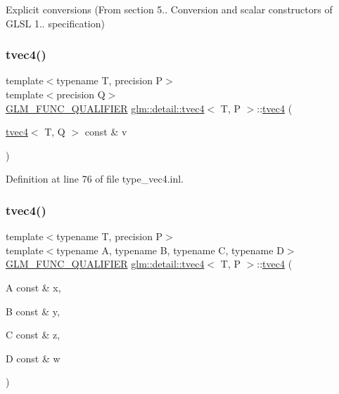 Explicit conversions (From section 5.. Conversion and scalar constructors of G\+L\+SL 1.. specification) 

\mbox{\label{structglm_1_1detail_1_1tvec4_a3030b13b21c84c52f89f14f802ae99f5}} 
\subsubsection{\texorpdfstring{tvec4()}{tvec4()}\hspace{0.1cm}{\footnotesize\ttfamily [15/23]}}
{\footnotesize\ttfamily template$<$typename T, precision P$>$ \\
template$<$precision Q$>$ \\
\hyperlink{setup_8hpp_a33fdea6f91c5f834105f7415e2a64407}{G\+L\+M\+\_\+\+F\+U\+N\+C\+\_\+\+Q\+U\+A\+L\+I\+F\+I\+ER} \hyperlink{structglm_1_1detail_1_1tvec4}{glm\+::detail\+::tvec4}$<$ T, P $>$\+::\hyperlink{structglm_1_1detail_1_1tvec4}{tvec4} (\begin{DoxyParamCaption}\item[{\hyperlink{structglm_1_1detail_1_1tvec4}{tvec4}$<$ T, Q $>$ const \&}]{v }\end{DoxyParamCaption})}



Definition at line 76 of file type\+\_\+vec4.\+inl.

\mbox{\label{structglm_1_1detail_1_1tvec4_ad49650086418f165378a3cb3bd6dff22}} 
\subsubsection{\texorpdfstring{tvec4()}{tvec4()}\hspace{0.1cm}{\footnotesize\ttfamily [16/23]}}
{\footnotesize\ttfamily template$<$typename T, precision P$>$ \\
template$<$typename A, typename B, typename C, typename D$>$ \\
\hyperlink{setup_8hpp_a33fdea6f91c5f834105f7415e2a64407}{G\+L\+M\+\_\+\+F\+U\+N\+C\+\_\+\+Q\+U\+A\+L\+I\+F\+I\+ER} \hyperlink{structglm_1_1detail_1_1tvec4}{glm\+::detail\+::tvec4}$<$ T, P $>$\+::\hyperlink{structglm_1_1detail_1_1tvec4}{tvec4} (\begin{DoxyParamCaption}\item[{A const \&}]{x,  }\item[{B const \&}]{y,  }\item[{C const \&}]{z,  }\item[{D const \&}]{w }\end{DoxyParamCaption})}



